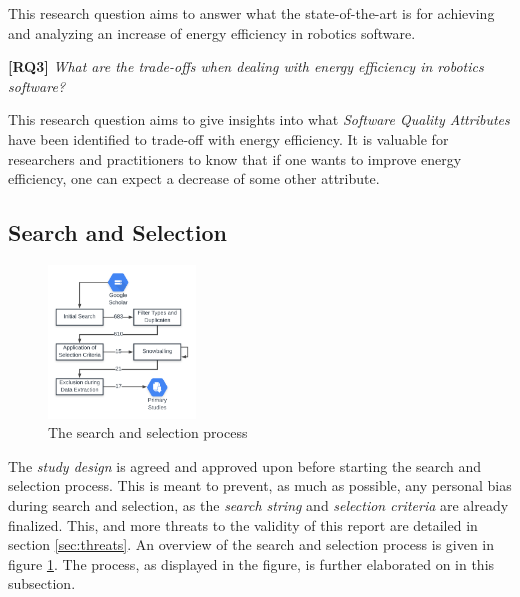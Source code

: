 This research question aims to answer what the state-of-the-art is for achieving and analyzing an increase of energy efficiency in robotics software.

\vspace{2mm}

\textbf{[RQ3]} \textit{What are the trade-offs when dealing with energy efficiency in robotics software?}

\vspace{2mm}

This research question aims to give insights into what \textit{Software Quality Attributes\cite{iso2011quality_attributes}} have been identified to trade-off with energy efficiency. 
It is valuable for researchers and practitioners to know that if one wants to improve energy efficiency, 
one can expect a decrease of some other attribute.

\subsection{Search and Selection}
\label{sec:study_design:search_selection}
\begin{figure}
    \centering
    \includegraphics[width=0.35\textwidth]{figures/selection_process_var2.png}
    \caption{The search and selection process}
    \label{fig:search_selec_process}
\end{figure}
 
The \textit{study design} is agreed and approved upon before starting the search and selection process. 
This is meant to prevent, as much as possible, any personal bias during search and selection, as the \textit{search string} and \textit{selection criteria} are already finalized.
This, and more threats to the validity of this report are detailed in section \ref{sec:threats}.
An overview of the search and selection process is given in figure \ref{fig:search_selec_process}.
The process, as displayed in the figure, is further elaborated on in this subsection.

\vspace{2mm}

